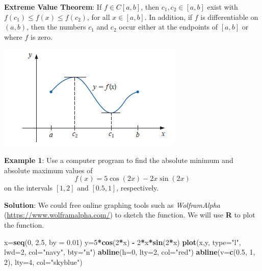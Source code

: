 \documentclass[
]{book}
\newenvironment{Shaded}{\begin{snugshade}}{\end{snugshade}}
\newcommand{\AttributeTok}[1]{\textcolor[rgb]{0.13,0.29,0.53}{#1}}
\newcommand{\DecValTok}[1]{\textcolor[rgb]{0.00,0.00,0.81}{#1}}
\newcommand{\FloatTok}[1]{\textcolor[rgb]{0.00,0.00,0.81}{#1}}
\newcommand{\FunctionTok}[1]{\textcolor[rgb]{0.13,0.29,0.53}{\textbf{#1}}}
\newcommand{\NormalTok}[1]{#1}
\newcommand{\OtherTok}[1]{\textcolor[rgb]{0.56,0.35,0.01}{#1}}
\newcommand{\SpecialCharTok}[1]{\textcolor[rgb]{0.81,0.36,0.00}{\textbf{#1}}}
\newcommand{\StringTok}[1]{\textcolor[rgb]{0.31,0.60,0.02}{#1}}
\begin{document}
\textbf{Extreme Value Theorem}: If \(f \in C[a, b]\), then \(c_1, c_2 \in [a, b]\) exist with \(f (c_1) \le f (x) \le f (c_2)\), for all \(x \in [a, b]\). In addition, if \(f\) is differentiable on \((a, b)\), then the numbers \(c_1\) and \(c_2\) occur either at the endpoints of \([a, b]\) or where \(f\) is zero.

\begin{center}\includegraphics[width=0.75\linewidth]{img01/w01-ExtremeValue} \end{center}

\textbf{Example 1}: Use a computer program to find the absolute minimum and absolute maximum values of
\[
f (x) = 5 \cos (2x) - 2x \sin (2x)
\]
on the intervals \([1, 2]\) and \([0.5, 1]\), respectively.

\textbf{Solution}: We could free online graphing tools such as \emph{WolframAlpha} (\url{https://www.wolframalpha.com/}) to sketch the function. We will use \textbf{R} to plot the function.

\begin{Shaded}
\begin{Highlighting}[]
\NormalTok{x}\OtherTok{=}\FunctionTok{seq}\NormalTok{(}\DecValTok{0}\NormalTok{, }\FloatTok{2.5}\NormalTok{, }\AttributeTok{by =} \FloatTok{0.01}\NormalTok{)}
\NormalTok{y}\OtherTok{=}\DecValTok{5}\SpecialCharTok{*}\FunctionTok{cos}\NormalTok{(}\DecValTok{2}\SpecialCharTok{*}\NormalTok{x) }\SpecialCharTok{{-}} \DecValTok{2}\SpecialCharTok{*}\NormalTok{x}\SpecialCharTok{*}\FunctionTok{sin}\NormalTok{(}\DecValTok{2}\SpecialCharTok{*}\NormalTok{x)}
\FunctionTok{plot}\NormalTok{(x,y, }\AttributeTok{type=}\StringTok{"l"}\NormalTok{, }\AttributeTok{lwd=}\DecValTok{2}\NormalTok{, }\AttributeTok{col=}\StringTok{"navy"}\NormalTok{, }\AttributeTok{bty=}\StringTok{"n"}\NormalTok{)}
\FunctionTok{abline}\NormalTok{(}\AttributeTok{h=}\DecValTok{0}\NormalTok{, }\AttributeTok{lty=}\DecValTok{2}\NormalTok{, }\AttributeTok{col=}\StringTok{"red"}\NormalTok{)}
\FunctionTok{abline}\NormalTok{(}\AttributeTok{v=}\FunctionTok{c}\NormalTok{(}\FloatTok{0.5}\NormalTok{, }\DecValTok{1}\NormalTok{, }\DecValTok{2}\NormalTok{), }\AttributeTok{lty=}\DecValTok{4}\NormalTok{, }\AttributeTok{col=}\StringTok{"skyblue"}\NormalTok{)}
\end{Highlighting}
\end{Shaded}
\end{document}
